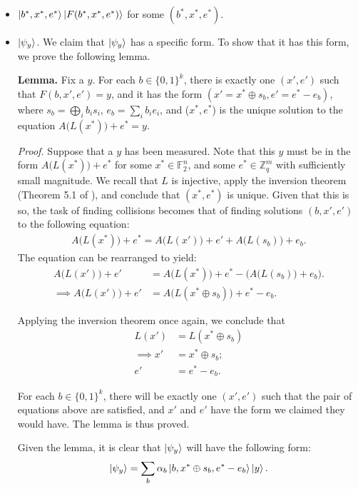 \documentclass{article}
\begin{document}
\begin{itemize}
		\item $\ket{b^*, x^*, e^*} \ket{F(b^*, x^*, e^*)}$ for some $(b^*, x^*, e^*)$.
     \item $\ket{\psi_y}$. We claim that $\ket{\psi_y}$ has a specific form. To show that it has this form, we prove the following lemma.
		
		\textbf{Lemma.} Fix a $y$. For each $b \in \{0,1\}^k$, there is exactly one $(x', e')$ such that $F(b, x', e') = y$, and it has the form $(x' = x^* \oplus s_b, e' = e^* - e_b)$, where $s_b = \bigoplus_i b_i s_i$, $e_b = \sum_i b_i e_i$, and ($x^*, e^*$) is the unique solution to the equation $A\big( L(x^*) \big) + e^* = y$.

		\textit{Proof.} Suppose that a $y$ has been measured. Note that this $y$ must be in the form $A\big( L(x^*) \big) + e^*$ for some $x^* \in \mathbb{F}_2^n$, and some $e^* \in \mathbb{Z}_q^m$ with sufficiently small magnitude. We recall that $L$ is injective, apply the inversion theorem (Theorem 5.1 of \cite{MP11}), and conclude that $(x^*, e^*)$ is unique. Given that this is so, the task of finding collisions becomes that of finding solutions $(b, x', e')$ to the following equation:
		\begin{align}
			A\big( L(x^*) \big) + e^* = A\big( L(x') \big) + e' + A\big( L(s_{b}) \big) + e_{b}.
		\end{align}
		The equation can be rearranged to yield:
		\begin{align}
			A\big( L(x') \big) + e' &= A\big( L(x^*) \big) + e^* - \Big( A\big( L(s_{b}) \big) + e_{b} \Big). \\
			\implies A\big( L(x') \big) + e' &= A\big( L(x^* \oplus s_{b}) \big) + e^* - e_{b}.
		\end{align}

		Applying the inversion theorem once again, we conclude that
		\begin{align}
			L(x') &= L(x^* \oplus s_{b}) \\
			\implies x' &= x^* \oplus s_{b}; \\
			e' &= e^* - e_{b}.
		\end{align}

		For each $b \in \{0,1\}^k$, there will be exactly one $(x', e')$ such that the pair of equations above are satisfied, and $x'$ and $e'$ have the form we claimed they would have. The lemma is thus proved.

		Given the lemma, it is clear that $\ket{\psi_y}$ will have the following form:
		\begin{align}
			\ket{\psi_y} = \sum_b \alpha_b \ket{b, x^* \oplus s_b, e^* - e_b} \ket{y}.
		\end{align}
\end{itemize}
\end{document}
